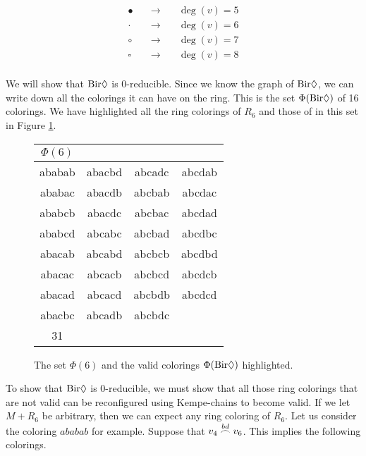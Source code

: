 \begin{equation*}
    \begin{matrix}
    \bullet &\quad \longrightarrow \quad &\deg(v)=5 \\
    \cdot &\quad \longrightarrow \quad & \deg(v)=6 \\
    \circ &\quad \longrightarrow \quad & \deg(v)=7 \\
    \square &\quad \longrightarrow \quad  & \deg(v)=8 \\
    \end{matrix}
\end{equation*}

We will show that $\bir$ is 0-reducible. Since we know the graph of $\bir$, we can write down all the colorings it can have on the ring. This is the set $\Phi(\bir)$ of 16 colorings. We have highlighted all the ring colorings of $R_6$ and those of in this set in Figure \ref{table:colsring6}.

\needspace{4cm}
\begin{figure}[!ht]
    \centering
    \begin{tabular}{ cccc }
        $\Phi(6) $ & \\
        \hline
        ababab & abacbd & abcadc &  \cellcolor{g0} abcdab \\
        \cellcolor{g0} ababac &  \cellcolor{g0} abacdb &  \cellcolor{g0} abcbab & abcdac \\
        \cellcolor{g0} ababcb &  \cellcolor{g0} abacdc &  \cellcolor{g0} abcbac & abcdad \\
        ababcd & abcabc &  \cellcolor{g0} abcbad & abcdbc \\
        abacab & abcabd & abcbcb & abcdbd \\
        \cellcolor{g0} abacac &  \cellcolor{g0} abcacb &  \cellcolor{g0} abcbcd &  \cellcolor{g0} abcdcb \\
        abacad &  \cellcolor{g0} abcacd & abcbdb &  \cellcolor{g0} abcdcd \\
        \cellcolor{g0} abacbc &  \cellcolor{g0} abcadb & abcbdc \\
        \hline
        31 & \\
    \end{tabular}
    \caption{The set $\Phi(6)$ and the valid colorings $\Phi(\bir)$ highlighted. }
    \label{table:colsring6}
\end{figure}

To show that $\bir$ is 0-reducible, we must show that all those ring colorings that are not valid can be reconfigured using Kempe-chains to become valid. If we let $M+R_6$ be arbitrary, then we can expect any ring coloring of $R_6$. Let us consider the coloring $ababab$ for example. Suppose that $\chain{v_4}{v_6}{bd}$. This implies the following colorings.

